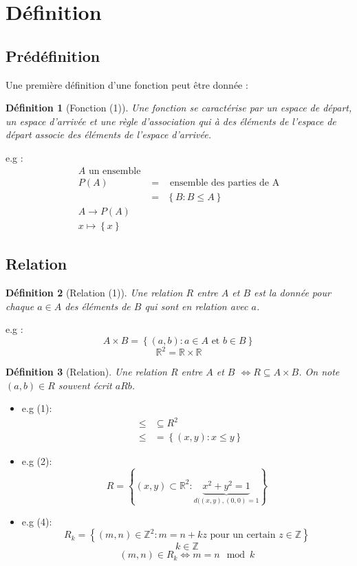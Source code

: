 \documentclass[a4paper,10pt]{report}
\newtheorem{de}{Définition}
\begin{document}
\section{Définition}
\subsection{Prédéfinition}
Une première définition d'une fonction peut être donnée :
\begin{de}[Fonction (1)]
Une fonction se caractérise par un espace de départ, un espace d'arrivée et une règle d'association qui à des éléments de l'espace de départ associe des éléments de l'espace d'arrivée.
\end{de}
e.g :
\begin{eqnarray*}
A \mbox{ un ensemble }\\
P(A) & = & \mbox{ ensemble des parties de A}\\
& = & \left\lbrace B : B \leq A \right\rbrace\\
A \rightarrow P(A)\\
x \mapsto \left\lbrace x \right\rbrace
\end{eqnarray*}
\subsection{Relation}
\begin{de}[Relation (1)]
Une relation $R$ entre $A$ et $B$ est la donnée pour chaque $a \in A$ des éléments de $B$ qui sont en relation avec $a$.
\end{de}
e.g :
$$A\times B=\left\lbrace (a,b) : a \in A \mbox{ et } b \in B \right\rbrace$$
$$\mathbb{R}^2=\mathbb{R}\times \mathbb{R}$$
\begin{de}[Relation]
Une relation $R$ entre $A$ et $B$ $\Leftrightarrow R \subseteq A \times B$. On note $(a,b) \in R$ souvent écrit $a R b$.
\end{de}
\begin{itemize}
\item{e.g (1):
\begin{eqnarray*}
& \leq & \subseteq R^2\\
& \leq & = \left\lbrace (x,y) : x \leq y \right\rbrace
\end{eqnarray*}}
\item{e.g (2):
$$R=\left\lbrace (x,y) \subset \mathbb{R}^2 : \underbrace{x^2 + y^2 = 1}_{d((x,y),(0,0)=1} \right\rbrace$$
}
\item{e.g (4):
$$R_k=\left\lbrace (m,n) \in \mathbb{Z}^2 : m=n+kz \mbox{ pour un certain } z \in \mathbb{Z} \right\rbrace$$
$$k\in \mathbb{Z}$$
$$(m,n) \in R_k \Leftrightarrow m=n \mod k$$
}
\end{itemize}
\end{document}
